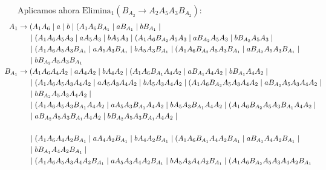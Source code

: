 \documentclass[12pt]{article}
\begin{document}
\begin{ejercicio}[2.5 puntos]
\begin{description}
        Aplicamos ahora $\text{Elimina}_1(B_{A_2}\rightarrow A_2 A_5 A_3 B_{A_2})$:
        \begin{align*}
            \hspace{-2.5cm}A_1 &\to (A_1 A_6 \mid a \mid b\mid (A_1 A_6 B_{A_1} \mid a B_{A_1} \mid b B_{A_1}
                \mid \\ & \hspace{0.5cm} \mid (A_1 A_6A_5A_3 \mid aA_5A_3 \mid bA_5A_3 \mid (A_1 A_6 B_{A_2}A_5A_3 \mid  a B_{A_2}A_5A_3 \mid  b B_{A_2}A_5A_3
                \mid \\ & \hspace{0.5cm} \mid (A_1 A_6 A_5 A_3 B_{A_1} \mid aA_5 A_3 B_{A_1} \mid bA_5 A_3 B_{A_1} \mid (A_1 A_6 B_{A_2}A_5 A_3 B_{A_1} \mid  a B_{A_2}A_5 A_3 B_{A_1}
                \mid \\ & \hspace{0.5cm} \mid b B_{A_2}A_5 A_3 B_{A_1} \\
            \hspace{-2.5cm}B_{A_1} &\to (A_1 A_6 A_4 A_2 \mid aA_4 A_2 \mid bA_4 A_2\mid (A_1 A_6 B_{A_1}A_4 A_2 \mid a B_{A_1}A_4 A_2 \mid b B_{A_1}A_4 A_2
                \mid \\ & \hspace{0.5cm} \mid (A_1 A_6A_5A_3A_4 A_2 \mid aA_5A_3 A_4 A_2\mid bA_5A_3A_4 A_2 \mid (A_1 A_6 B_{A_2}A_5A_3 A_4 A_2\mid  a B_{A_2}A_5A_3A_4 A_2
                \mid \\ & \hspace{0.5cm} \mid b B_{A_2}A_5A_3A_4 A_2
                \mid \\ & \hspace{0.5cm} \mid (A_1 A_6 A_5 A_3 B_{A_1}A_4 A_2 \mid aA_5 A_3 B_{A_1}A_4 A_2 \mid bA_5 A_3 B_{A_1}A_4 A_2 \mid (A_1 A_6 B_{A_2}A_5 A_3 B_{A_1}A_4 A_2
                \mid \\ & \hspace{0.5cm} \mid  a B_{A_2}A_5 A_3 B_{A_1}A_4 A_2 \mid b B_{A_2}A_5 A_3 B_{A_1}A_4 A_2
                \mid \\ \hspace{-2.5cm}\\ & \hspace{0.5cm} \mid (A_1 A_6 A_4 A_2 B_{A_1} \mid aA_4 A_2 B_{A_1} \mid bA_4 A_2 B_{A_1}\mid (A_1 A_6 B_{A_1}A_4 A_2 B_{A_1} \mid a B_{A_1}A_4 A_2 B_{A_1}
                \mid \\ & \hspace{0.5cm} \mid b B_{A_1}A_4 A_2 B_{A_1}
                \mid \\ & \hspace{0.5cm} \mid (A_1 A_6A_5A_3A_4 A_2 B_{A_1} \mid aA_5A_3 A_4 A_2 B_{A_1}\mid bA_5A_3A_4 A_2 B_{A_1} \mid (A_1 A_6 B_{A_2}A_5A_3 A_4 A_2 B_{A_1}

\end{align*}
\end{description}
\end{ejercicio}
\end{document}
